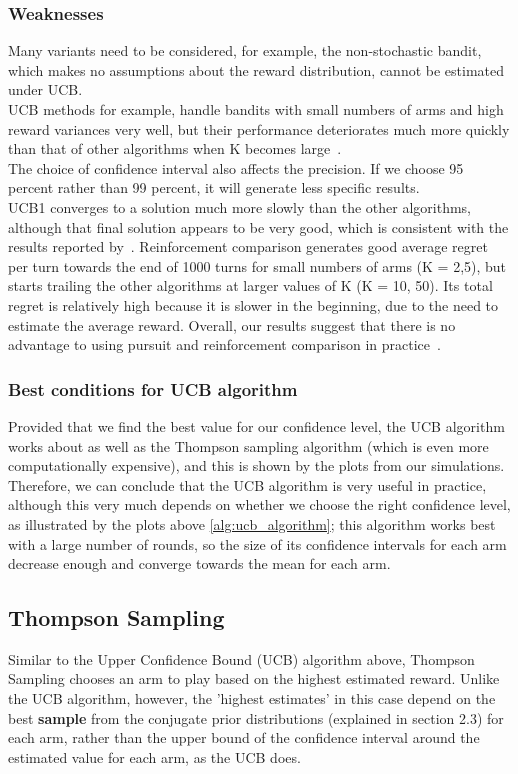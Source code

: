 \subsubsection{Weaknesses}
Many variants need to be considered, for example, the non-stochastic bandit, which makes no assumptions about the reward distribution, cannot be estimated under UCB\@.
\\UCB methods for example, handle bandits with small numbers of arms and high reward variances very well, but their performance deteriorates much more quickly than that of other algorithms when K becomes large~\citep{Kuleshov}.
\\The choice of confidence interval also affects the precision.
If we choose 95 percent rather than 99 percent, it will generate less specific results.
\\UCB1 converges to a solution much more slowly than the other algorithms, although that final solution appears to be very good, which is consistent with the results reported by~\citep{Auer2002}.
Reinforcement comparison generates good average regret per turn towards the end of 1000 turns for small numbers of arms (K = 2,5), but starts trailing the other algorithms at larger values of K (K = 10, 50).
Its total regret is relatively high because it is slower in the beginning, due to the need to estimate the average reward.
Overall, our results suggest that there is no advantage to using pursuit and reinforcement comparison in practice~\citep{Kuleshov}.

\subsubsection{Best conditions for UCB algorithm}
Provided that we find the best value for our confidence level, the UCB algorithm works about as well as the Thompson sampling algorithm (which is even more computationally expensive), and this is shown by the plots from our simulations. 
Therefore, we can conclude that the UCB algorithm is very useful in practice, although this very much depends on whether we choose the right confidence level, as illustrated by the plots above \ref{alg:ucb_algorithm}; this algorithm works best with a large number of rounds, so the size of its confidence intervals for each arm decrease enough and converge towards the mean for each arm.

\subsection{Thompson Sampling}\label{subsec:thompson-sampling}
Similar to the Upper Confidence Bound (UCB) algorithm above, Thompson Sampling chooses an arm to play based on the highest estimated reward.
Unlike the UCB algorithm, however, the 'highest estimates' in this case depend on the best \textbf{sample} from the conjugate prior distributions (explained in section 2.3) for each arm, rather than the upper bound of the confidence interval around the estimated value for each arm, as the UCB does.

